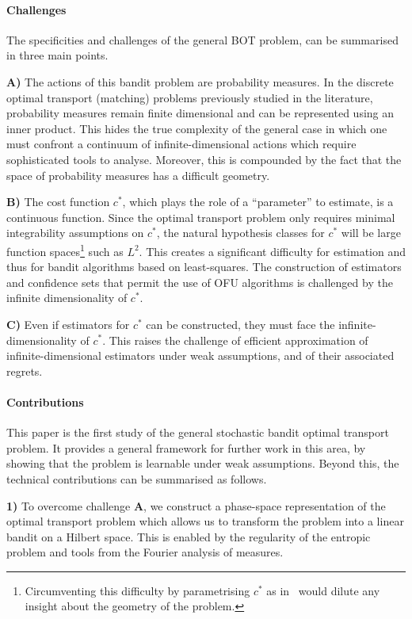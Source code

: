\paragraph{Challenges} The specificities and challenges of the general BOT problem, can be summarised in three main points. 

\textbf{A)} The actions of this bandit problem are probability measures. In the discrete optimal transport (matching) problems previously studied in the literature, probability measures remain finite dimensional and can be represented using an inner product. This hides the true complexity of the general case in which one must confront a continuum of infinite-dimensional actions which require sophisticated tools to analyse. Moreover, this is compounded by the fact that the space of probability measures has a difficult geometry. 

\textbf{B)} The cost function $c^*$, which plays the role of a ``parameter'' to estimate, is a continuous function. Since the optimal transport problem only requires minimal integrability assumptions on $c^*$, the natural hypothesis classes for $c^*$ will be large function spaces\footnote{Circumventing this difficulty by parametrising $c^*$ as in~\cite{zhu_semidiscrete_2023} would dilute any insight about the geometry of the problem.} such as $L^2$.  This creates a significant difficulty for estimation and thus for bandit algorithms based on least-squares. The construction of estimators and confidence sets that permit the use of OFU algorithms is  challenged by the infinite dimensionality of $c^*$. 

\textbf{C)} Even if estimators for $c^*$ can be constructed, they must face the infinite-dimensionality of $c^*$. This raises the challenge of efficient approximation of infinite-dimensional estimators under weak assumptions, and of their associated regrets.

\paragraph{Contributions} This paper is the first study of the general stochastic bandit optimal transport problem. It provides a general framework for further work in this area, by showing that the problem is learnable under weak assumptions. Beyond this, the technical contributions can be summarised as follows.

\textbf{1)} To overcome challenge \textbf{A}, we construct a phase-space representation of the optimal transport problem which allows us to transform the problem into a linear bandit on a Hilbert space. This is enabled by the regularity of the entropic problem and tools from the Fourier analysis of measures.  


